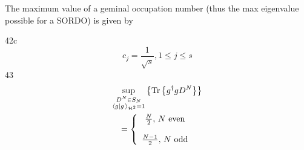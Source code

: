 \documentclass[aps,preprint]{revtex4}%
\begin{document}
\bigskip

The maximum value of a geminal occupation number (thus the max eigenvalue
possible for a SORDO) is given by

42c%
\[
c_{j}=\frac{1}{\sqrt{s}},1\leq j\leq s
\]
43%
\begin{gather*}
\sup_{\substack{D^{N}\in S_{N}\\\left\langle g\left\vert g\right.
\right\rangle _{\mathcal{H}^{2}}=1}}\left\{  \operatorname*{Tr}\left\{
g^{\dagger}gD^{N}\right\}  \right\}  \\
=\left\{
\begin{array}
[c]{c}%
\frac{N}{2},\,N\text{ even}\\
\\
\frac{N-1}{2},\,N\text{ odd}%
\end{array}
\right.
\end{gather*}
\end{document}
